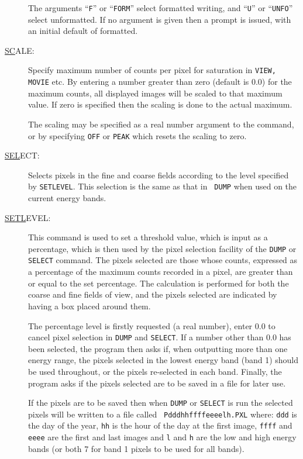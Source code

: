 \begin{description}
The arguments ``{\tt F}'' or ``{\tt FORM}'' select formatted writing,
and ``{\tt U}'' or ``{\tt UNFO}'' select unformatted. If no argument is
given then a prompt is issued, with an initial default of formatted.

\item[\underline{SC}ALE: ] \label{sc}
Specify maximum number of counts per pixel for saturation in {\tt VIEW,
MOVIE} etc. By entering a number greater than zero (default is 0.0) for
the maximum counts, all displayed images will be scaled to that maximum
value. If zero is specified then the scaling is done to the actual
maximum.

The scaling may be specified as a real number argument to the command,
or by specifying {\tt OFF} or {\tt PEAK} which resets the scaling to
zero.

\item[\underline{SEL}ECT:] \label{sel}
Selects pixels in the fine and coarse fields according to the level
specified by {\tt SETLEVEL}. This selection is the same as that in {\tt
DUMP} when used on the current energy bands.

\item[\underline{SETL}EVEL: ] \label{setl}
This command is used to set a threshold value, which is input as a
percentage, which is then used by the pixel selection facility of the
{\tt DUMP} or {\tt SELECT} command.  The pixels selected are those
whose counts, expressed as a percentage of the maximum counts recorded
in a pixel, are greater than or equal to the set percentage. The
calculation is performed for both the coarse and fine fields of view,
and the pixels selected are indicated by having a box placed around
them.

The percentage level is firstly requested (a real number), enter 0.0 to
cancel pixel selection in {\tt DUMP} and {\tt SELECT}.  If a number
other than 0.0 has been selected, the program then asks if, when
outputting more than one energy range, the pixels selected in the
lowest energy band (band 1) should be used throughout, or the pixels
re-selected in each band. Finally, the program asks if the pixels
selected are to be saved in a file for later use.

If the pixels are to be saved then when {\tt DUMP} or {\tt SELECT} is
run the selected pixels will be written to a file called {\tt
Pdddhhffffeeeelh.PXL} where: {\tt ddd} is the day of the year, {\tt hh}
is the hour of the day at the first image, {\tt ffff} and {\tt eeee}
are the first and last images and {\tt l} and {\tt h} are the low and
high energy bands (or both 7 for band 1 pixels to be used for all
bands).


\end{description}
